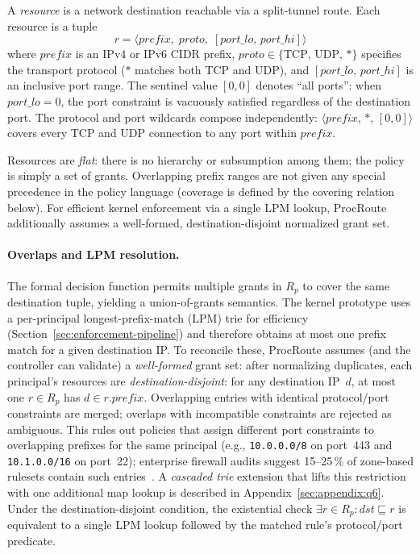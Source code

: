 \documentclass[sigconf]{acmart}
\begin{document}
A \emph{resource} is a network destination reachable via a
split-tunnel route.  Each resource is a tuple
\[
  r = \langle \mathit{prefix},\; \mathit{proto},\;
        [\mathit{port\_lo},\, \mathit{port\_hi}] \rangle
\]
where $\mathit{prefix}$ is an IPv4 or IPv6 CIDR prefix,
$\mathit{proto} \in \{\mathrm{TCP},\, \mathrm{UDP},\, \mathord{*}\}$
specifies the transport protocol ($\mathord{*}$ matches both TCP
and UDP), and
$[\mathit{port\_lo},\, \mathit{port\_hi}]$ is an inclusive port range.
The sentinel value $[0,0]$ denotes ``all ports'': when
$\mathit{port\_lo} = 0$, the port constraint is vacuously
satisfied regardless of the destination port.
The protocol and port wildcards compose independently:
$\langle \mathit{prefix},\, \mathord{*},\, [0,0] \rangle$ covers
every TCP and UDP connection to any port within
$\mathit{prefix}$.

Resources are \emph{flat}: there is no hierarchy or subsumption
among them; the policy is simply a set of grants.  Overlapping prefix ranges are not given any special
precedence in the policy language (coverage is defined by the covering
relation below).  For efficient kernel enforcement via a single LPM
lookup, ProcRoute additionally assumes a well-formed,
destination-disjoint normalized grant set.

\paragraph{Overlaps and LPM resolution.}
\label{sec:lpm-overlaps}
The formal decision function permits multiple grants
in $R_p$ to cover the same destination tuple, yielding a union-of-grants semantics.
The kernel prototype uses a per-principal longest-prefix-match (LPM) trie for
efficiency (Section~\ref{sec:enforcement-pipeline}) and therefore obtains at most
one prefix match for a given destination IP.
To reconcile these, ProcRoute assumes (and the controller can validate) a
\emph{well-formed} grant set: after normalizing duplicates, each principal's
resources are \emph{destination-disjoint}: for any destination IP~$d$, at most
one $r\in R_p$ has $d\in r.\mathit{prefix}$.
Overlapping entries with identical protocol/port constraints are merged; overlaps
with incompatible constraints are rejected as ambiguous.
This rules out policies that assign different port constraints to
overlapping prefixes for the same principal (e.g., \texttt{10.0.0.0/8}
on port~443 and \texttt{10.1.0.0/16} on port~22); enterprise firewall
audits suggest 15--25\,\% of zone-based rulesets contain such
entries~\cite{wool2004quantitative,wool2010trends}.
A \emph{cascaded trie} extension that lifts this restriction with one
additional map lookup is described in Appendix~\ref{sec:appendix:q6}.
Under the destination-disjoint condition, the existential check $\exists r\in R_p:\mathit{dst}\sqsubseteq r$
is equivalent to a single LPM lookup followed by the matched rule's
protocol/port predicate.
\end{document}
